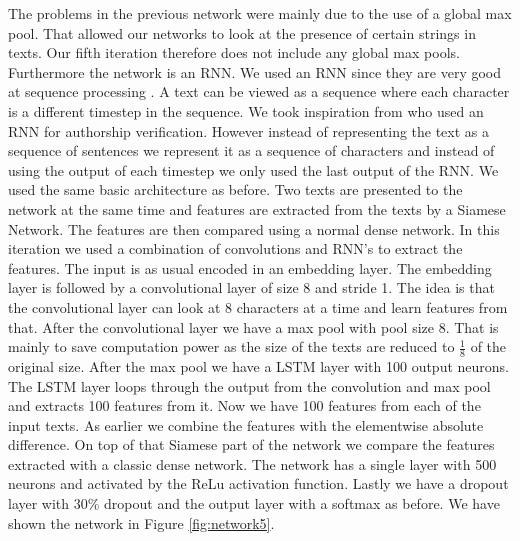 The problems in the previous network were mainly due to the use of a global
max pool. That allowed our networks to look at the presence of certain strings
in texts. Our fifth iteration therefore does not include any global max pools.
Furthermore the network is an \gls{RNN}. We used an \gls{RNN} since they are
very good at sequence processing \cite{DBLP:series/sci/2012-385}. A text can
be viewed as a sequence where each character is a different timestep in the
sequence. We took inspiration from \cite{DBLP:journals/corr/RuderGB16c} who
used an \gls{RNN} for authorship verification. However instead of representing
the text as a sequence of sentences we represent it as a sequence of characters
and instead of using the output of each timestep we only used the last output
of the \gls{RNN}. We used the same basic architecture as before. Two texts are
presented to the network at the same time and features are extracted from the
texts by a Siamese Network. The features are then compared using a normal dense
network. In this iteration we used a combination of convolutions and \gls{RNN}'s
to extract the features. The input is as usual encoded in an embedding layer.
The embedding layer is followed by a convolutional layer of size 8 and stride
1. The idea is that the convolutional layer can look at 8 characters at a time
and learn features from that. After the convolutional layer we have a max pool
with pool size 8. That is mainly to save computation power as the size of the
texts are reduced to $\frac{1}{8}$ of the original size. After the max pool we
have a \gls{LSTM} layer with 100 output neurons. The \gls{LSTM} layer loops
through the output from the convolution and max pool and extracts 100 features
from it. Now we have 100 features from each of the input texts. As earlier we
combine the features with the elementwise absolute difference. On top of that
Siamese part of the network we compare the features extracted with a classic
dense network. The network has a single layer with 500 neurons and activated by
the \gls{ReLu} activation function. Lastly we have a dropout layer with 30\%
dropout and the output layer with a softmax as before. We have shown the network
in Figure \ref{fig:network5}.

